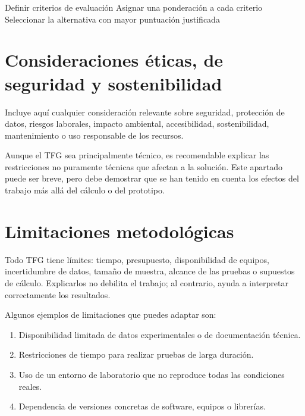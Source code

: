 \begin{algorithm}[H]
    \DontPrintSemicolon
    Definir criterios de evaluación\;
    Asignar una ponderación a cada criterio\;
    Seleccionar la alternativa con mayor puntuación justificada\;
    \caption{Ejemplo de procedimiento de selección}
    \label{alg:seleccion-alternativa}
\end{algorithm}

\section{Consideraciones éticas, de seguridad y sostenibilidad}
\label{sec:consideraciones}

Incluye aquí cualquier consideración relevante sobre seguridad, protección de
datos, riesgos laborales, impacto ambiental, accesibilidad, sostenibilidad,
mantenimiento o uso responsable de los recursos.

Aunque el TFG sea principalmente técnico, es recomendable explicar las
restricciones no puramente técnicas que afectan a la solución. Este apartado
puede ser breve, pero debe demostrar que se han tenido en cuenta los efectos del
trabajo más allá del cálculo o del prototipo.

\section{Limitaciones metodológicas}
\label{sec:limitaciones-metodologicas}

Todo TFG tiene límites: tiempo, presupuesto, disponibilidad de equipos,
incertidumbre de datos, tamaño de muestra, alcance de las pruebas o supuestos de
cálculo. Explicarlos no debilita el trabajo; al contrario, ayuda a interpretar
correctamente los resultados.

Algunos ejemplos de limitaciones que puedes adaptar son:

\begin{enumerate}
    \item Disponibilidad limitada de datos experimentales o de documentación técnica.
    \item Restricciones de tiempo para realizar pruebas de larga duración.
    \item Uso de un entorno de laboratorio que no reproduce todas las condiciones reales.
    \item Dependencia de versiones concretas de software, equipos o librerías.
\end{enumerate}
